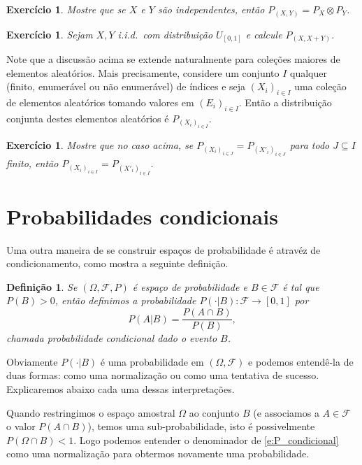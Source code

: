 \documentclass[reqno, final]{book}
\newcommand*\1{\mathds{1}}
\newtheorem{definition}[theorem]{Definição}
\newtheorem{exercise}[example]{Exercício}
\def \iid{i.i.d.~}
\begin{document}
\begin{exercise}
  Mostre que se $X$ e $Y$ são independentes, então $P_{(X,Y)} = P_X \otimes P_Y$.
\end{exercise}

\begin{exercise}
  Sejam $X, Y$ \iid com distribuição $U_{[0,1]}$ e calcule $P_{(X, X + Y)}$.
\end{exercise}

Note que a discussão acima se extende naturalmente para coleções maiores de elementos aleatórios.
Mais precisamente, considere um conjunto $I$ qualquer (finito, enumerável ou não enumerável) de índices e seja $(X_i)_{i \in I}$ uma coleção de elementos aleatórios tomando valores em $(E_i)_{i \in I}$.
Então a distribuição conjunta destes elementos aleatórios é $P_{(X_i)_{i \in I}}$.

\begin{exercise}
  Mostre que no caso acima, se $P_{(X_i)_{i \in J}} = P_{(X'_i)_{i \in J}}$ para todo $J \subseteq I$ finito, então $P_{(X_i)_{i \in I}} = P_{(X'_i)_{i \in I}}$.
\end{exercise}

\vfill
\newpage

\section{Probabilidades condicionais}

Uma outra maneira de se construir espaços de probabilidade é atravéz de condicionamento, como mostra a seguinte definição.
\begin{definition}
  Se $(\Omega, \mathcal{F}, P)$ é espaço de probabilidade e $B \in \mathcal{F}$ é tal que $P(B) > 0$, então definimos a probabilidade  $P(\cdot | B): \mathcal{F} \to [0,1]$ por
  \begin{equation}
    \label{e:P_condicional}
    P(A | B) = \frac{P(A \cap B)}{P(B)},
  \end{equation}
  chamada probabilidade condicional dado o evento $B$.
\end{definition}

Obviamente $P(\cdot | B)$ é uma probabilidade em $(\Omega, \mathcal{F})$ e podemos entendê-la de duas formas: como uma normalização ou como uma tentativa de sucesso.
Explicaremos abaixo cada uma dessas interpretações.

Quando restringimos o espaço amostral $\Omega$ ao conjunto $B$ (e associamos a $A \in \mathcal{F}$ o valor $P(A \cap B)$), temos uma sub-probabilidade, isto é possivelmente $P(\Omega \cap B) < 1$.
Logo podemos entender o denominador de \eqref{e:P_condicional} como uma normalização para obtermos novamente uma probabilidade.
\end{document}
